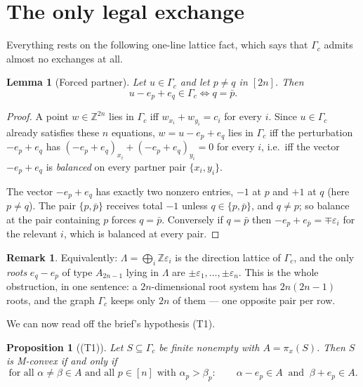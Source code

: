 \documentclass[11pt]{article}
\newtheorem{proposition}[theorem]{Proposition}
\newtheorem{lemma}[theorem]{Lemma}
\theoremstyle{definition}
\newtheorem{remark}[theorem]{Remark}
\newcommand{\Z}{\mathbb{Z}}
\begin{document}
\section{The only legal exchange}

Everything rests on the following one-line lattice fact, which says that $\Gamma_c$ admits
almost no exchanges at all.

\begin{lemma}[Forced partner]\label{lem:partner}
Let $u\in\Gamma_c$ and let $p\ne q$ in $[2n]$. Then
\[
u-e_p+e_q\in\Gamma_c \iff q=\bar p .
\]
\end{lemma}

\begin{proof}
A point $w\in\Z^{2n}$ lies in $\Gamma_c$ iff $w_{x_i}+w_{y_i}=c_i$ for every $i$. Since
$u\in\Gamma_c$ already satisfies these $n$ equations, $w=u-e_p+e_q$ lies in $\Gamma_c$ iff
the perturbation $-e_p+e_q$ has $(-e_p+e_q)_{x_i}+(-e_p+e_q)_{y_i}=0$ for every $i$, i.e.\
iff the vector $-e_p+e_q$ is \emph{balanced} on every partner pair $\{x_i,y_i\}$.

The vector $-e_p+e_q$ has exactly two nonzero entries, $-1$ at $p$ and $+1$ at $q$ (here
$p\neq q$). The pair $\{p,\bar p\}$ receives total $-1$ unless $q\in\{p,\bar p\}$, and
$q\ne p$; so balance at the pair containing $p$ forces $q=\bar p$. Conversely if $q=\bar p$
then $-e_p+e_{\bar p}=\mp\varepsilon_i$ for the relevant $i$, which is balanced at every pair.
\end{proof}

\begin{remark}
Equivalently: $\Lambda=\bigoplus_i\Z\varepsilon_i$ is the direction lattice of $\Gamma_c$, and
the only \emph{roots} $e_q-e_p$ of type $A_{2n-1}$ lying in $\Lambda$ are $\pm\varepsilon_1,
\dots,\pm\varepsilon_n$. This is the whole obstruction, in one sentence: a $2n$-dimensional
root system has $2n(2n-1)$ roots, and the graph $\Gamma_c$ keeps only $2n$ of them --- one
opposite pair per row.
\end{remark}

We can now read off the brief's hypothesis (T1).

\begin{proposition}[(T1)]\label{prop:T1}
Let $S\subseteq\Gamma_c$ be finite nonempty with $A=\pi_x(S)$. Then $S$ is M-convex if and
only if
\begin{equation}\label{eq:T1}
\text{for all }\alpha\ne\beta\in A\text{ and all }p\in[n]\text{ with }\alpha_p>\beta_p:
\qquad \alpha-e_p\in A \ \text{ and }\ \beta+e_p\in A .
\end{equation}
\end{proposition}
\end{document}
